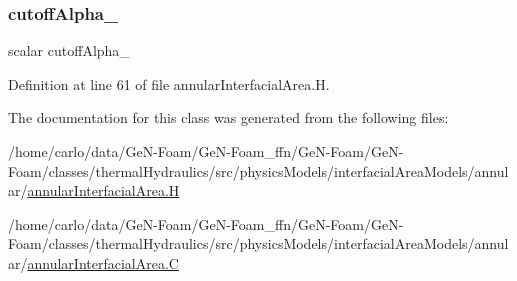 \subsubsection{\texorpdfstring{cutoff\+Alpha\+\_\+}{cutoffAlpha\_}}
{\footnotesize\ttfamily scalar cutoff\+Alpha\+\_\+\hspace{0.3cm}{\ttfamily [protected]}}



Definition at line 61 of file annular\+Interfacial\+Area.\+H.



The documentation for this class was generated from the following files\+:\begin{DoxyCompactItemize}
\item 
/home/carlo/data/\+Ge\+N-\/\+Foam/\+Ge\+N-\/\+Foam\+\_\+ffn/\+Ge\+N-\/\+Foam/\+Ge\+N-\/\+Foam/classes/thermal\+Hydraulics/src/physics\+Models/interfacial\+Area\+Models/annular/\hyperlink{annularInterfacialArea_8H}{annular\+Interfacial\+Area.\+H}\item 
/home/carlo/data/\+Ge\+N-\/\+Foam/\+Ge\+N-\/\+Foam\+\_\+ffn/\+Ge\+N-\/\+Foam/\+Ge\+N-\/\+Foam/classes/thermal\+Hydraulics/src/physics\+Models/interfacial\+Area\+Models/annular/\hyperlink{annularInterfacialArea_8C}{annular\+Interfacial\+Area.\+C}\end{DoxyCompactItemize}
